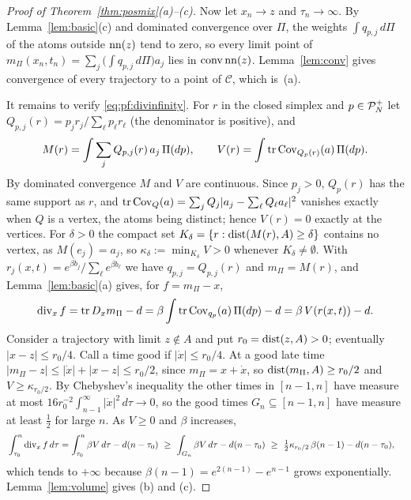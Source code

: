 \documentclass{article} %
\newcommand{\iclrstart}{\begin{aligned}&}\newcommand{\iclrend}{\end{aligned}}
\newcommand{\iclrallow}{\allowbreak}
\newcommand{\iclrstart}{}\newcommand{\iclrend}{}\newcommand{\iclrallow}{}
\theoremstyle{plain}
\theoremstyle{definition}
\theoremstyle{remark}
\begin{document}
\begin{proof}[Proof of Theorem~\ref{thm:posmix}(a)--(c)]
Now let $x_n\to z$ and $\tau_n\to\infty$. By Lemma~\ref{lem:basic}(c) and dominated convergence over
$\Pi$, the weights $\int q_{p,j}\,d\Pi$ of the atoms outside $\operatorname{nn}(z)$ tend to zero, so every limit
point of $m_\Pi(x_n,t_n)=\sum_j\bigl(\int q_{p,j}\,d\Pi\bigr)a_j$ lies in $\operatorname{conv}\operatorname{nn}(z)$.
Lemma~\ref{lem:conv} gives convergence of every trajectory to a point of $\mathcal C$, which is~(a).

It remains to verify \eqref{eq:pf:divinfinity}. For $r$ in the closed simplex and $p\in\mathcal{P}_N^{+}$ let
$Q_{p,j}(r)=p_jr_j/\sum_\ell p_\ell r_\ell$ (the denominator is positive), and
\[
M(r)=\int\sum_jQ_{p,j}(r)\,a_j\,\Pi(dp),\qquad V(r)=\int\operatorname{tr}\operatorname{Cov}_{Q_p(r)}(a)\,\Pi(dp).
\]
By dominated convergence $M$ and $V$ are continuous. Since $p_j>0$, $Q_p(r)$ has the same support as
$r$, and $\operatorname{tr}\operatorname{Cov}_Q(a)=\sum_jQ_j|a_j-\sum_\ell Q_\ell a_\ell|^2$ vanishes exactly when $Q$ is a
vertex, the atoms being distinct; hence $V(r)=0$ exactly at the vertices. For $\delta>0$ the compact
set $K_\delta=\{r:\operatorname{dist}(M(r),A)\ge\delta\}$ contains no vertex, as $M(e_j)=a_j$, so
$\kappa_\delta:=\min_{K_\delta}V>0$ whenever $K_\delta\neq\emptyset$. With
$r_j(x,t)=e^{\beta b_j}/\sum_\ell e^{\beta b_\ell}$ we have $q_{p,j}=Q_{p,j}(r)$ and $m_\Pi=M(r)$,
and Lemma~\ref{lem:basic}(a) gives, for $f=m_\Pi-x$,
\[
\operatorname{div}_xf=\operatorname{tr} D_xm_\Pi-d=\beta\int\operatorname{tr}\operatorname{Cov}_{q_p}(a)\,\Pi(dp)-d=\beta\,V(r(x,t))-d .
\]
Consider a trajectory with limit $z\notin A$ and put $r_0=\operatorname{dist}(z,A)>0$; eventually
$|x-z|\le r_0/4$. Call a time good if $|\dot x|\le r_0/4$. At a good late time
$|m_\Pi-z|\le|\dot x|+|x-z|\le r_0/2$, since $m_\Pi=x+\dot x$, so $\operatorname{dist}(m_\Pi,A)\ge r_0/2$ and
$V\ge\kappa_{r_0/2}$. By Chebyshev's inequality the other times in $[n-1,n]$ have measure at most
$16r_0^{-2}\int_{n-1}^\infty|\dot x|^2\,d\tau\to0$, so the good times $G_n\subseteq[n-1,n]$ have
measure at least $\tfrac12$ for large $n$. As $V\ge0$ and $\beta$ increases,
\begin{align*}
\iclrstart\int_{\tau_0}^n\operatorname{div}_xf\,d\tau
=\int_{\tau_0}^n\beta V\,d\tau-d(n-\tau_0)
\ \ge\ \int_{G_n}\beta V\,d\tau-d(n-\tau_0)
\iclrbrq\ \ge\ \tfrac12\kappa_{r_0/2}\,\beta(n-1)-d(n-\tau_0),\iclrend
\end{align*}
which tends to $+\infty$ because $\beta(n-1)=e^{2(n-1)}-e^{n-1}$ grows exponentially.
Lemma~\ref{lem:volume} gives (b) and (c).
\end{proof}
\end{document}

